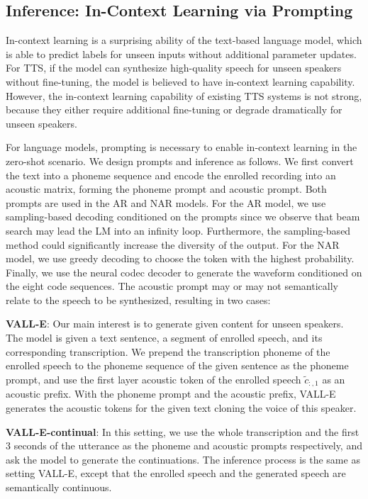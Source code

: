 \documentclass{article}
\theoremstyle{plain}
\theoremstyle{definition}
\theoremstyle{remark}
\newcommand\our{\textsc{VALL-E}}
\begin{document}
\subsection{Inference: In-Context Learning via Prompting}

 In-context learning is a surprising ability of the text-based language model, which is able to predict labels for unseen inputs without additional parameter updates. For TTS, if the model can synthesize high-quality speech for unseen speakers without  fine-tuning, the model is believed to have in-context learning capability. However, the in-context learning capability of existing TTS systems is not strong, because they  either require additional fine-tuning or degrade dramatically for unseen speakers.  

 For language models, prompting is necessary to enable in-context learning in the zero-shot scenario. We design prompts and inference as follows. 
 We first convert the text into  a phoneme sequence  and encode the enrolled recording into an acoustic matrix, forming the phoneme prompt and acoustic prompt. Both prompts are used in the AR and NAR models.  For the AR model, we use sampling-based decoding conditioned on the prompts  since we observe that beam search may lead the LM into an infinity loop. Furthermore, the sampling-based method could significantly increase the diversity of the output.  For the NAR model, we use greedy decoding to choose the token with the highest probability. Finally, we use the neural codec decoder to generate the waveform conditioned on the eight code sequences. The acoustic prompt may or may not  semantically relate to the speech to be synthesized, resulting in two cases:

\noindent \textbf{\our{}}: Our main interest is to generate given content for unseen speakers. The model is given a text sentence, a segment of enrolled speech, and its corresponding transcription. 
We prepend the transcription phoneme of the enrolled speech to the phoneme sequence of the given sentence as the phoneme prompt, and use the first layer acoustic token of the enrolled speech $\tilde{c}_{:, 1}$ as an acoustic prefix. With the phoneme prompt and the acoustic prefix, \our{} generates the acoustic tokens for the given text cloning the voice of this speaker. 

\noindent \textbf{\our{}-continual}:  In this setting, we use the whole transcription and the first 3 seconds of the utterance as the phoneme and acoustic prompts respectively, and ask the model to generate the continuations. The inference process is the same as setting \our{}, except that the enrolled speech and the generated speech are semantically continuous.
\end{document}
